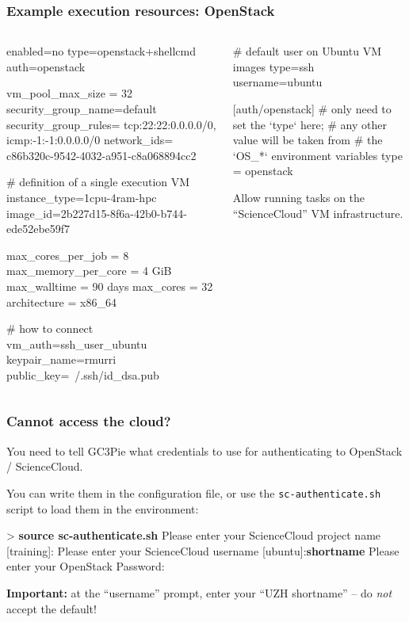 \documentclass[english,serif,mathserif,usenames,dvipsnames]{beamer}
\begin{document}
\begin{frame}[fragile]
  \frametitle{Example execution resources: OpenStack}
  \begin{columns}[t]
    \begin{column}{0.5\textwidth}
\begin{stdout}
enabled=no
type=openstack+shellcmd
auth=openstack

vm_pool_max_size = 32
security_group_name=default
security_group_rules=
  tcp:22:22:0.0.0.0/0,
  icmp:-1:-1:0.0.0.0/0
network_ids=
  c86b320c-9542-4032-a951-c8a068894cc2

# definition of a single execution VM
instance_type=1cpu-4ram-hpc
image_id=2b227d15-8f6a-42b0-b744-ede52ebe59f7

max_cores_per_job = 8
max_memory_per_core = 4 GiB
max_walltime = 90 days
max_cores = 32
architecture = x86_64

# how to connect
vm_auth=ssh_user_ubuntu
keypair_name=rmurri
public_key=~/.ssh/id_dsa.pub
\end{stdout}
    \end{column}
    \begin{column}{0.5\textwidth}
      \begin{stdout}
# default user on Ubuntu VM images
type=ssh
username=ubuntu


[auth/openstack]
# only need to set the `type` here;
# any other value will be taken from
# the `OS\_*` environment variables
type = openstack
      \end{stdout}

      \+\+\+
      Allow running tasks on the ``ScienceCloud'' VM infrastructure.

    \end{column}
  \end{columns}
\end{frame}


\begin{frame}[fragile]
  \frametitle{Cannot access the cloud?}

  You need to tell GC3Pie what credentials to use for authenticating to
  OpenStack / ScienceCloud.

  You can write them in the configuration file, or use the
  \texttt{sc-authenticate.sh} script to load them in the environment:
\begin{semiverbatim}\footnotesize
> {\bfseries source sc-authenticate.sh}
Please enter your ScienceCloud project name [training]:
Please enter your ScienceCloud username [ubuntu]:{\bfseries shortname}
Please enter your OpenStack Password:
\end{semiverbatim}

  \textbf{Important:} at the ``username'' prompt, enter your ``UZH shortname''
  -- do \emph{not} accept the default!
\end{frame}
\end{document}
